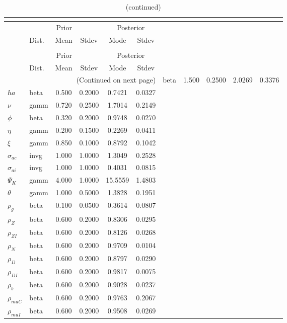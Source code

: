  
\begin{center}
\begin{longtable}{llcccc} 
\caption{Results from posterior maximization (parameters)}\\
 \label{Table:Posterior:1}\\
\toprule 
  & \multicolumn{3}{c}{Prior}  &  \multicolumn{2}{c}{Posterior} \\
  \cmidrule(r{.75em}){2-4} \cmidrule(r{.75em}){5-6}
  & Dist. & Mean  & Stdev & Mode & Stdev \\ 
\midrule \endfirsthead 
\caption{(continued)}\\
 \bottomrule 
  & \multicolumn{3}{c}{Prior}  &  \multicolumn{2}{c}{Posterior} \\
  \cmidrule(r{.75em}){2-4} \cmidrule(r{.75em}){5-6}
  & Dist. & Mean  & Stdev & Mode & Stdev \\ 
\midrule \endhead 
\bottomrule \multicolumn{6}{r}{(Continued on next page)}\endfoot 
\bottomrule\endlastfoot 
${\sigma}$ & beta &   1.500 & 0.2500 &   2.0269 &  0.3376 \\ 
${ha}$ & beta &   0.500 & 0.2000 &   0.7421 &  0.0327 \\ 
$\nu$ & gamm &   0.720 & 0.2500 &   1.7014 &  0.2149 \\ 
${\phi}$ & beta &   0.320 & 0.2000 &   0.9748 &  0.0270 \\ 
${\eta}$ & gamm &   0.200 & 0.1500 &   0.2269 &  0.0411 \\ 
$\xi$ & gamm &   0.850 & 0.1000 &   0.8792 &  0.1042 \\ 
${\sigma_{ac}}$ & invg &   1.000 & 1.0000 &   1.3049 &  0.2528 \\ 
${\sigma_{ai}}$ & invg &   1.000 & 1.0000 &   0.4031 &  0.0815 \\ 
${\Psi_{K}}$ & gamm &   4.000 & 1.0000 &  15.5559 &  1.4803 \\ 
${\theta}$ & gamm &   1.000 & 0.5000 &   1.3828 &  0.1951 \\ 
${\rho_g}$ & beta &   0.100 & 0.0500 &   0.3614 &  0.0807 \\ 
${\rho_Z}$ & beta &   0.600 & 0.2000 &   0.8306 &  0.0295 \\ 
${\rho_{ZI}}$ & beta &   0.600 & 0.2000 &   0.8126 &  0.0268 \\ 
${\rho_N}$ & beta &   0.600 & 0.2000 &   0.9709 &  0.0104 \\ 
${\rho_D}$ & beta &   0.600 & 0.2000 &   0.8797 &  0.0290 \\ 
${\rho_{DI}}$ & beta &   0.600 & 0.2000 &   0.9817 &  0.0075 \\ 
${\rho_b}$ & beta &   0.600 & 0.2000 &   0.9028 &  0.0237 \\ 
${\rho_{muC}}$ & beta &   0.600 & 0.2000 &   0.9763 &  0.2067 \\ 
${\rho_{muI}}$ & beta &   0.600 & 0.2000 &   0.9508 &  0.0269 \\ 
\end{longtable}
 \end{center}
